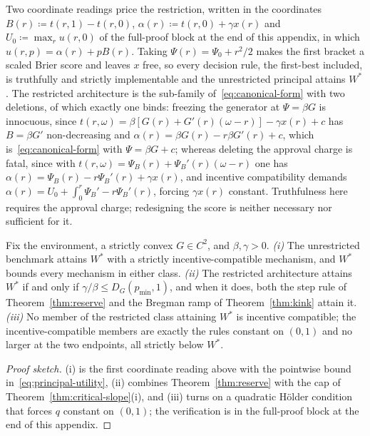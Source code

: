 \documentclass[acmsmall,nonacm,screen]{acmart}
\theoremstyle{acmplain}%
\theoremstyle{acmdefinition}%
\numberwithin{equation}{section}
\newcommand{\suppsec}[1]{the full-proof block at the end of this appendix}
\begin{document}
\begin{appendix}
Two coordinate readings price the restriction, written in the coordinates $B(r)\coloneqq t(r,1)-t(r,0)$, $\alpha(r)\coloneqq t(r,0)+\gamma x(r)$ and $U_0\coloneqq\max_ru(r,0)$ of \suppsec{S.8}, in which $u(r,p)=\alpha(r)+pB(r)$. Taking $\Psi(r)=\Psi_0+r^2/2$ makes the first bracket a scaled Brier score and leaves $x$ free, so every decision rule, the first-best included, is truthfully and strictly implementable and the unrestricted principal attains $W^*$. The restricted architecture is the sub-family of~\eqref{eq:canonical-form} with two deletions, of which exactly one binds: freezing the generator at $\Psi=\beta G$ is innocuous, since $t(r,\omega)=\beta[G(r)+G'(r)(\omega-r)]-\gamma x(r)+c$ has $B=\beta G'$ non-decreasing and $\alpha(r)=\beta G(r)-r\beta G'(r)+c$, which is~\eqref{eq:canonical-form} with $\Psi=\beta G+c$; whereas deleting the approval charge is fatal, since with $t(r,\omega)=\Psi_B(r)+\Psi_B'(r)(\omega-r)$ one has $\alpha(r)=\Psi_B(r)-r\Psi_B'(r)+\gamma x(r)$, and incentive compatibility demands $\alpha(r)=U_0+\int_0^r\Psi_B'-r\Psi_B'(r)$, forcing $\gamma x(r)$ constant. Truthfulness here requires the approval charge; redesigning the score is neither necessary nor sufficient for it.

\begin{theorem}\label{thm:welfare-equivalence}
Fix the environment, a strictly convex $G\in C^2$, and $\beta,\gamma>0$. \emph{(i)} The unrestricted benchmark attains $W^*$ with a strictly incentive-compatible mechanism, and $W^*$ bounds every mechanism in either class. \emph{(ii)} The restricted architecture attains $W^*$ if and only if $\gamma/\beta\leq D_G(p_{\min},1)$, and when it does, both the step rule of Theorem~\ref{thm:reserve} and the Bregman ramp of Theorem~\ref{thm:kink} attain it. \emph{(iii)} No member of the restricted class attaining $W^*$ is incentive compatible; the incentive-compatible members are exactly the rules constant on $(0,1)$ and no larger at the two endpoints, all strictly below $W^*$.
\end{theorem}

\begin{proof}[Proof sketch]
(i) is the first coordinate reading above with the pointwise bound in~\eqref{eq:principal-utility}, (ii) combines Theorem~\ref{thm:reserve} with the cap of Theorem~\ref{thm:critical-slope}(i), and (iii) turns on a quadratic H\"older condition that forces $q$ constant on $(0,1)$; the verification is in \suppsec{S.9}.
\end{proof}


\end{appendix}
\end{document}
